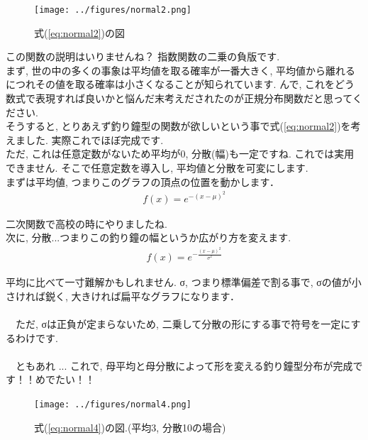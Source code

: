 \documentclass[11pt,a4paper,uplatex]{ujreport} 	%
\begin{document}
\begin{figure}[H]
\label{im:normal}
  \centering
  \texttt{[image: ../figures/normal2.png]}
  \caption{式(\ref{eq:normal2})の図}
\end{figure}

この関数の説明はいりませんね？ 指数関数の二乗の負版です.\\

まず, 世の中の多くの事象は平均値を取る確率が一番大きく, 平均値から離れるにつれその値を取る確率は小さくなることが知られています. んで, これをどう数式で表現すれば良いかと悩んだ末考えだされたのが正規分布関数だと思ってください.\\

そうすると, とりあえず釣り鐘型の関数が欲しいという事で式(\ref{eq:normal2})を考えました. 実際これでほぼ完成です.\\

ただ, これは任意定数がないため平均が0, 分散(幅)も一定ですね. これでは実用できません. そこで任意定数を導入し, 平均値と分散を可変にします. \\

まずは平均値, つまりこのグラフの頂点の位置を動かします．\\

\begin{align}
\label{eq:normal3}
f(x) = e^{-(x-\mu)^2}
\end{align}

二次関数で高校の時にやりましたね.\\

次に, 分散...つまりこの釣り鐘の幅というか広がり方を変えます. \\

\begin{align}
\label{eq:normal4}
f(x) = e^{-\frac{(x-\mu)^2}{\sigma^2}}
\end{align}

平均に比べて一寸難解かもしれません. σ, つまり標準偏差で割る事で, σの値が小さければ鋭く, 大きければ扁平なグラフになります．\\
\\
　ただ, σは正負が定まらないため, 二乗して分散の形にする事で符号を一定にするわけです. \\
\\
　ともあれ ... これで, 母平均と母分散によって形を変える釣り鐘型分布が完成です！！めでたい！！\\

\begin{figure}[H]
\label{im:normal}
  \centering
  \texttt{[image: ../figures/normal4.png]}
  \caption{式(\ref{eq:normal4})の図.(平均3, 分散10の場合)}
\end{figure}
\end{document}
